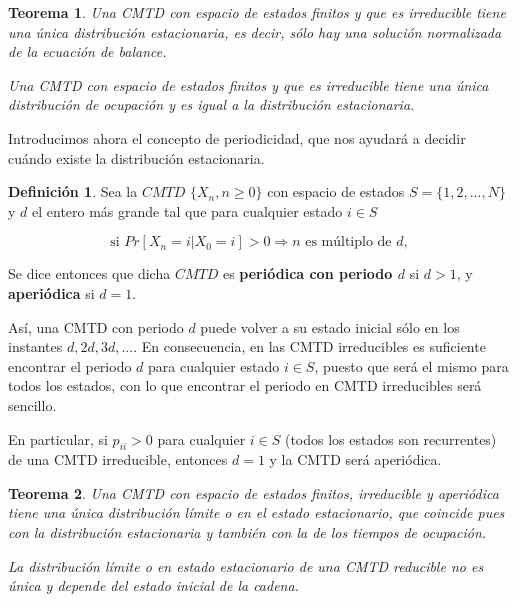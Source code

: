 \documentclass[
]{book}
\newenvironment{yellowbox}{
  \definecolor{shadecolor}{rgb}{210, 180, 140}  
  \color{black}
  \begin{shaded}}
 {\end{shaded}}
\newtheorem{theorem}{Teorema}[chapter]
\theoremstyle{definition}
\newtheorem{definition}{Definición}[chapter]
\theoremstyle{definition}
\theoremstyle{definition}
\theoremstyle{definition}
\theoremstyle{remark}
\begin{document}
\begin{yellowbox}

\begin{theorem}
Una CMTD con espacio de estados finitos y que es irreducible tiene una única distribución estacionaria, es decir, sólo hay una solución normalizada de la ecuación de balance.

Una CMTD con espacio de estados finitos y que es irreducible tiene una única distribución de ocupación y es igual a la distribución estacionaria.
\end{theorem}

\end{yellowbox}

Introducimos ahora el concepto de periodicidad, que nos ayudará a decidir cuándo existe la distribución estacionaria.

\begin{yellowbox}

\begin{definition}
\protect\hypertarget{def:periodo}{}\label{def:periodo}Sea la \(CMTD\) \(\{X_n, n \geq 0\}\) con espacio de estados \(S =\{1, 2,..., N\}\) y \(d\) el entero más grande tal que para cualquier estado \(i \in S\)

\[\text{si } Pr[X_n = i | X_0 = i] >0 \Rightarrow n \text{ es  múltiplo de } d,\]

Se dice entonces que dicha \(CMTD\) es \textbf{periódica con periodo \(d\)} si \(d>1\), y \textbf{aperiódica} si \(d = 1\).
\end{definition}

\end{yellowbox}

Así, una CMTD con periodo \(d\) puede volver a su estado inicial sólo en los instantes \(d, 2d, 3d, ...\). En consecuencia, en las CMTD irreducibles es suficiente encontrar el periodo \(d\) para cualquier estado \(i \in S\), puesto que será el mismo para todos los estados, con lo que encontrar el periodo en CMTD irreducibles será sencillo.

En particular, si \(p_{ii}>0\) para cualquier \(i\in S\) (todos los estados son recurrentes) de una CMTD irreducible, entonces \(d=1\) y la CMTD será aperiódica.

\begin{yellowbox}

\begin{theorem}
Una CMTD con espacio de estados finitos, irreducible y aperiódica tiene una única distribución límite o en el estado estacionario, que coincide pues con la distribución estacionaria y también con la de los tiempos de ocupación.

La distribución límite o en estado estacionario de una CMTD reducible no es única y depende del estado inicial de la cadena.
\end{theorem}

\end{yellowbox}
\end{document}
